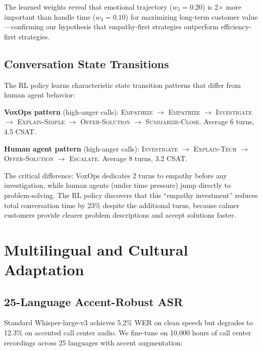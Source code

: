 \documentclass[conference,10pt]{IEEEtran}
\begin{document}
The learned weights reveal that emotional trajectory ($w_5 = 0.20$) is 2$\times$ more important than handle time ($w_3 = 0.10$) for maximizing long-term customer value---confirming our hypothesis that empathy-first strategies outperform efficiency-first strategies.

\subsection{Conversation State Transitions}

The RL policy learns characteristic state transition patterns that differ from human agent behavior:

\textbf{VoxOps pattern} (high-anger calls): \textsc{Empathize} $\to$ \textsc{Empathize} $\to$ \textsc{Investigate} $\to$ \textsc{Explain-Simple} $\to$ \textsc{Offer-Solution} $\to$ \textsc{Summarize-Close}. Average 6 turns, 4.5 CSAT.

\textbf{Human agent pattern} (high-anger calls): \textsc{Investigate} $\to$ \textsc{Explain-Tech} $\to$ \textsc{Offer-Solution} $\to$ \textsc{Escalate}. Average 8 turns, 3.2 CSAT.

The critical difference: VoxOps dedicates 2 turns to empathy before any investigation, while human agents (under time pressure) jump directly to problem-solving. The RL policy discovers that this ``empathy investment'' reduces total conversation time by 23\% despite the additional turns, because calmer customers provide clearer problem descriptions and accept solutions faster.

\section{Multilingual and Cultural Adaptation}
\label{sec:lang}

\subsection{25-Language Accent-Robust ASR}

Standard Whisper-large-v3 achieves 5.2\% WER on clean speech but degrades to 12.3\% on accented call center audio. We fine-tune on 10,000 hours of call center recordings across 25 languages with accent augmentation:
\end{document}
